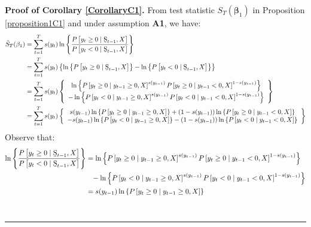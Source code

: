 \documentclass[harvard,11pt]{article}
\newenvironment{proof}[1][Proof]{\textbf{#1.} }{\  \rule{0.5em}{0.5em}}
\begin{document}
\begin{proof}[Proof of Corollary \protect\ref{CorollaryC1}]
From test statistic $S_{T}(\bm{\beta} _{1})$ in Proposition \ref{proposition1C1}
and under assumption \textbf{A1}, we have: 
\begingroup
\allowdisplaybreaks
\begin{align*}
\tilde{S}_{T}(\beta _{1}) &=\sum\limits_{t=1}^{T}s(y_{t})\ln \left\{ \frac{%
P\left[ y_{t}\geq 0\mid \text{\b{S}}_{t-1},X\right] }{P%
\left[ y_{t}<0\mid \text{\b{S}}_{t-1},X\right] }\right\} \\
&=\sum\limits_{t=1}^{T}s(y_{t})\left\{ \ln \left\{ P\left[
y_{t}\geq 0\mid \text{\b{S}}_{t-1},X\right] \right\} -\ln \left\{ P%
\left[ y_{t}<0\mid \text{\b{S}}_{t-1},X\right] \right\} \right\} \\
&=\sum\limits_{t=1}^{T}s(y_{t})\left\{ 
\begin{array}{c}
\ln \left\{ P\left[ y_{t}\geq 0\mid y_{t-1}\geq 0,X\right]
^{s(y_{t-1})}P\left[ y_{t}\geq 0\mid y_{t-1}<0,X\right]
^{1-s(y_{t-1})}\right\} \\ 
-\ln \left\{ P\left[ y_{t}<0\mid y_{t-1}\geq 0,X\right] ^{s(y_{t-1})}%
P\left[ y_{t}<0\mid y_{t-1}<0,X\right] ^{1-s(y_{t-1})}\right\}%
\end{array}%
\right\} \\
&=\sum\limits_{t=1}^{T}s(y_{t})\left\{ 
\begin{array}{c}
s(y_{t-1})\ln \left\{ P\left[ y_{t}\geq 0\mid y_{t-1}\geq 0,X\right]
\right\} +\left( 1-s(y_{t-1})\right) \ln \left\{ P\left[ y_{t}\geq
0\mid y_{t-1}<0,X\right] \right\} \\ 
-s(y_{t-1})\ln \left\{ P\left[ y_{t}<0\mid y_{t-1}\geq 0,X\right]
\right\} -\left( 1-s(y_{t-1})\right) \ln \left\{ P\left[
y_{t}<0\mid y_{t-1}<0,X\right] \right\}%
\end{array}%
\right\}
\end{align*}%
\endgroup
Observe that:%
\begingroup
\allowdisplaybreaks
\begin{align*}
\ln \left\{ \frac{P\left[ y_{t}\geq 0\mid \text{\b{S}}_{t-1},X\right] 
}{P\left[ y_{t}<0\mid \text{\b{S}}_{t-1},X\right] }\right\} &=\ln
\left\{ P\left[ y_{t}\geq 0\mid y_{t-1}\geq 0,X\right] ^{s(y_{t-1})}%
P\left[ y_{t}\geq 0\mid y_{t-1}<0,X\right] ^{1-s(y_{t-1})}\right\} \\
&\textcolor{white}{=}-\ln \left\{ P\left[ y_{t}<0\mid y_{t-1}\geq 0,X\right]
^{s(y_{t-1})}P\left[ y_{t}<0\mid y_{t-1}<0,X\right]
^{1-s(y_{t-1})}\right\} \\
&=s(y_{t-1})\ln \left\{ P\left[ y_{t}\geq 0\mid y_{t-1}\geq
0,X\right] \right\}\\

\end{align*}
\end{proof}
\end{document}
